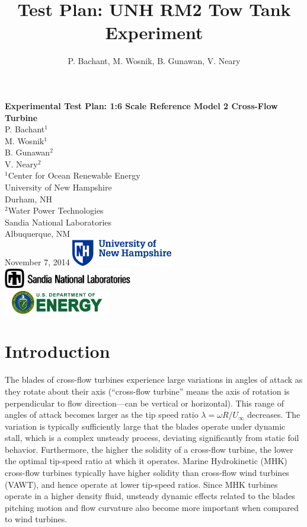 \documentclass[14pt,letterpaper]{scrreprt}
\author{P. Bachant, M. Wosnik, B. Gunawan, V. Neary}
\title{Test Plan: UNH RM2 Tow Tank Experiment}
\begin{document}
\begin{titlepage}
    \centering
    \vfill
    {\bfseries\Large
        Experimental Test Plan: 1:6 Scale Reference Model 2 Cross-Flow Turbine\\
    }  
            \vskip2cm
            P. Bachant$^1$\\
            M. Wosnik$^1$\\
            B. Gunawan$^2$\\
            V. Neary$^2$\\  
    \vfill
    $^1$Center for Ocean Renewable Energy \\
    University of New Hampshire \\
    Durham, NH \\
    \vspace{0.1in}
    $^2$Water Power Technologies \\
    Sandia National Laboratories \\
    Albuquerque, NM \\
    \vfill
    November 7, 2014
    \vfill
    \includegraphics[width=0.33\textwidth]{Figures/unhlogo} \\
    \vspace{0.1in}
    \includegraphics[width=0.42\textwidth]{Figures/snllogo} \\
    \vspace{0.1in}
    \includegraphics[width=0.35\textwidth]{Figures/doelogo}
    \vfill
\end{titlepage}

\tableofcontents

\chapter{Introduction}

The blades of cross-flow turbines experience large variations in angles of
attack as they rotate about their axis (``cross-flow turbine'' means the axis of
rotation is perpendicular to flow direction---can be vertical or horizontal).
This range of angles of attack becomes larger as the tip speed ratio
$\lambda=\omega R/U_\infty$  decreases.  The variation is typically sufficiently
large that the blades operate under dynamic stall, which is a complex unsteady
process, deviating significantly from static foil behavior. Furthermore, the
higher the solidity of a cross-flow turbine, the lower the optimal tip-speed
ratio at which it operates. Marine Hydrokinetic (MHK) cross-flow turbines
typically have higher solidity than cross-flow wind turbines (VAWT), and hence
operate at lower tip-speed ratios. Since MHK turbines operate in a higher
density fluid, unsteady dynamic effects related to the blades pitching motion
and flow curvature also become more important when compared to wind turbines.
\end{document}
